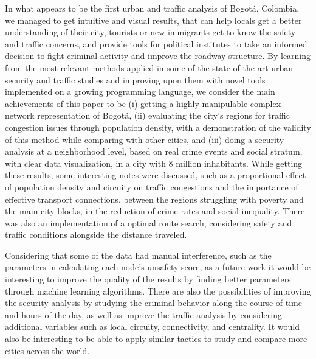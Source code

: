 \documentclass[runningheads]{llncs}
\begin{document}
In what appears to be the first urban and traffic analysis of Bogotá, Colombia, we managed to get intuitive and visual results, that can help locals get a better understanding of their city, tourists or new immigrants get to know the safety and traffic concerns, and provide tools for political institutes to take an informed decision to fight criminal activity and improve the roadway structure. By learning from the most relevant methods applied in some of the state-of-the-art urban security and traffic studies and improving upon them with novel tools implemented on a growing programming language, we consider the main achievements of this paper to be (i) getting a highly manipulable complex network representation of Bogotá, (ii) evaluating the city's regions for traffic congestion issues through population density, with a demonstration of the validity of this method while comparing with other cities, and (iii) doing a security analysis at a neighborhood level, based on real crime events and social stratum, with clear data visualization, in a city with 8 million inhabitants. While getting these results, some interesting notes were discussed, such as a proportional effect of population density and circuity on traffic congestions and the importance of effective transport connections, between the regions struggling with poverty and the main city blocks, in the reduction of crime rates and social inequality. There was also an implementation of a optimal route search, considering safety and traffic conditions alongside the distance traveled.

Considering that some of the data had manual interference, such as the parameters in calculating each node's unsafety score, as a future work it would be interesting to improve the quality of the results by finding better parameters through machine learning algorithms. There are also the possibilities of improving the security analysis by studying the criminal behavior along the course of time and hours of the day, as well as improve the traffic analysis by considering additional variables such as local circuity, connectivity, and centrality. It would also be interesting to be able to apply similar tactics to study and compare more cities across the world.


\newpage
\printbibliography
\end{document}
